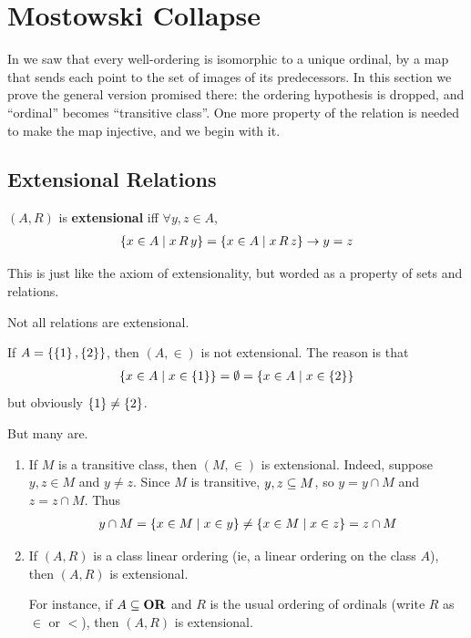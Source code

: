 \section{Mostowski Collapse}

In  we saw that every well-ordering is isomorphic to a unique ordinal, by a map that sends each point to the set of images of its predecessors. In this section we prove the general version promised there: the ordering hypothesis is dropped, and ``ordinal'' becomes ``transitive class''. One more property of the relation is needed to make the map injective, and we begin with it.

\subsection{Extensional Relations}

\begin{boxdefinition}[Extensionality]
    $(A, R)$ is \textbf{extensional} iff $\forall y, z \in A$,
    \begin{align*}
        \left\{ x \in A \; \middle\vert \; x \, R \, y \right\} = \left\{ x \in A \; \middle\vert \; x \, R \, z \right\}
        \to y = z
    \end{align*}
\end{boxdefinition}

This is just like the axiom of extensionality, but worded as a property of sets and relations.

Not all relations are extensional.

\begin{boxnexample} \hfill
    If $A = \left\{ \left\{ 1 \right\}, \left\{ 2 \right\} \right\}$, then $(A, \in)$ is not extensional. The reason is that
    \begin{align*}
        \left\{ x \in A \; \middle\vert \; x \in \left\{ 1 \right\} \right\} = \emptyset = \left\{ x \in A \; \middle\vert \; x \in \left\{ 2 \right\} \right\}
    \end{align*}
    but obviously $\left\{ 1 \right\} \ne \left\{ 2 \right\}$.
\end{boxnexample}

But many are.

\begin{boxexample} \hfill
    \begin{enumerate}
        \item If $M$ is a transitive class, then $(M, \in)$ is extensional. Indeed, suppose $y, z \in M$ and $y \ne z$. Since $M$ is transitive, $y, z \subseteq M$, so $y = y \cap M$ and $z = z \cap M$. Thus
            \begin{align*}
                y \cap M = \left\{ x \in M \; \middle\vert \; x \in y \right\} \neq \left\{ x \in M \; \middle\vert \; x \in z \right\} = z \cap M
            \end{align*}

        \item If $(A, R)$ is a class linear ordering (ie, a linear ordering on the class $A$), then $(A, R)$ is extensional.

        For instance, if $A \subseteq \mathbf{OR}$ and $R$ is the usual ordering of ordinals (write $R$ as $\in$ or $<$), then $(A, R)$ is extensional.
    \end{enumerate}
\end{boxexample}

